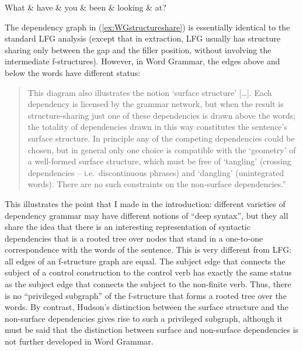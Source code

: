 \documentclass[output=paper,hidelinks]{langscibook}
\begin{document}
\begin{exe}
  \ex \label{ex:WGstructureshare}
  \begin{dependency}[baseline=-0.6ex,theme=simple]
    \begin{deptext}
      What \& have \& you \& been \& looking \& at?\\
    \end{deptext}
  \end{dependency}
\end{exe}

The dependency graph in (\ref{ex:WGstructureshare})  is
essentially identical to the standard LFG analysis (except that in
extraction, LFG usually has structure sharing only between the gap and
the filler position, without involving the inter\-mediate f-struc\-tures).
However, in Word Grammar, the edges above and below the words have
different status:
\begin{quote}This diagram also illustrates the notion `surface
structure' [\dots]. Each dependency is licensed by the grammar
network, but when the result is structure-sharing just one of these
dependencies is drawn above the words; the totality of dependencies
drawn in this way constitutes the sentence's surface structure. In
principle any of the competing dependencies could be chosen, but in
general only one choice is compatible with the `geometry' of a
well-formed surface structure, which must be free of `tangling'
(crossing dependencies -- i.e.\ discontinuous phrases) and `dangling'
(unintegrated words). There are no such constraints on the non-surface
dependencies.'' \citep[521]{Hudson2003}
\end{quote}

This illustrates the point that I made in the introduction: different
varieties of dependency grammar may have different notions of ``deep
syntax'', but they all share the idea that there is an interesting
representation of syntactic dependencies that is a rooted tree over
nodes that stand in a one-to-one correspondence with the words of the
sentence. This is very different from LFG: all edges of an f-structure
graph are equal. The subject edge that connects the subject of a
control construction to the control verb has exactly the same status
as the subject edge that connects the subject to the non-finite
verb. Thus, there is no ``privileged subgraph'' of the f-structure
that forms a rooted tree over the words. By contrast, Hudson's
distinction between the surface structure and the non-surface
dependencies gives rise to such a privileged subgraph, although it
must be said that the distinction between surface and non-surface
dependencies is not further developed in Word Grammar.
\end{document}
